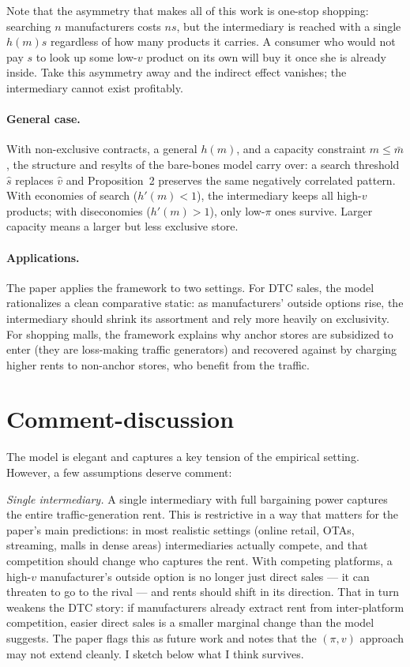 \documentclass[11pt]{article}
\begin{document}
Note that the asymmetry that makes all of this work is one-stop shopping: searching $n$ manufacturers costs $ns$, but the intermediary is reached with a single $h(m)s$ regardless of how many products it carries. A consumer who would not pay $s$ to look up some low-$v$ product on its own will buy it once she is already inside. Take this asymmetry away and the indirect effect vanishes; the intermediary cannot exist profitably.

\paragraph{General case.} With non-exclusive contracts, a general $h(m)$, and a capacity constraint $m\leq\bar{m}$, the structure and resylts of the bare-bones model carry over: a search threshold $\hat{s}$ replaces $\hat{v}$ and Proposition~2 preserves the same negatively correlated pattern. With economies of search ($h'(m)<1$), the intermediary keeps all high-$v$ products; with diseconomies ($h'(m)>1$), only low-$\pi$ ones survive. Larger capacity means a larger but less exclusive store.

\paragraph{Applications.} The paper applies the framework to two settings. For DTC sales, the model rationalizes a clean comparative static: as manufacturers' outside options rise, the intermediary should shrink its assortment and rely more heavily on exclusivity. For shopping malls, the framework explains why anchor stores are subsidized to enter (they are loss-making traffic generators) and recovered against by charging higher rents to non-anchor stores, who benefit from the traffic.
\section{Comment-discussion}
\label{Discussion}
The model is elegant and captures a key tension of the empirical setting. However, a few assumptions deserve comment:

\textit{Single intermediary.} A single intermediary with full bargaining power captures the entire traffic-generation rent. This is restrictive in a way that matters for the paper's main predictions: in most realistic settings (online retail, OTAs, streaming, malls in dense areas) intermediaries actually compete, and that competition should change who captures the rent. With competing platforms, a high-$v$ manufacturer's outside option is no longer just direct sales --- it can threaten to go to the rival --- and rents should shift in its direction. That in turn weakens the DTC story: if manufacturers already extract rent from inter-platform competition, easier direct sales is a smaller marginal change than the model suggests. The paper flags this as future work and notes that the $(\pi,v)$ approach may not extend cleanly. I sketch below what I think survives.
\end{document}
